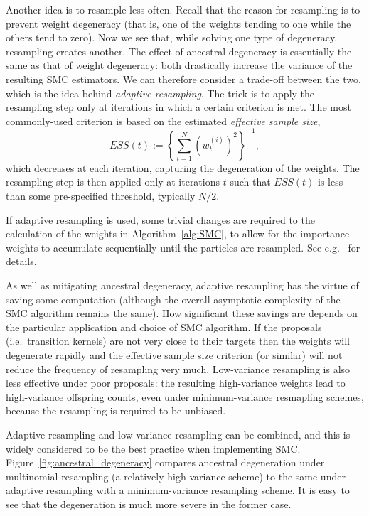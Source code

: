 Another idea is to resample less often. Recall that the reason for resampling is to prevent weight degeneracy (that is, one of the weights tending to one while the others tend to zero). Now we see that, while solving one type of degeneracy, resampling creates another. The effect of ancestral degeneracy is essentially the same as that of weight degeneracy: both drastically increase the variance of the resulting SMC estimators. 
We can therefore consider a trade-off between the two, which is the idea behind \emph{adaptive resampling}\seb{[citation]}.
The trick is to apply the resampling step only at iterations in which a certain criterion is met. The most  commonly-used criterion is based on the estimated \emph{effective sample size},
\begin{equation*}
ESS(t) := \left\{ \sum_{i=1}^N (w_t^{(i)})^2 \right\}^{-1} ,
\end{equation*}
which decreases at each iteration, capturing the degeneration of the weights.
The resampling step is then applied only at iterations $t$ such that $ESS(t)$ is less than some pre-specified threshold, typically $N/2$\seb{[citation]}.

If adaptive resampling is used, some trivial changes are required to the calculation of the weights in Algorithm~\ref{alg:SMC}, to allow for the importance weights to accumulate sequentially until the particles are resampled. See e.g.\ \textcite[Section 10.2]{chopin2020} for details.

As well as mitigating ancestral degeneracy, adaptive resampling has the virtue of saving some computation (although the overall asymptotic complexity of the SMC algorithm remains the same).
How significant these savings are depends on the particular application and choice of SMC algorithm. If the proposals (i.e.\ transition kernels) are not very close to their targets then the weights will degenerate rapidly and the effective sample size criterion (or similar) will not reduce the frequency of resampling very much.
Low-variance resampling is also less effective under poor proposals: the resulting high-variance weights lead to high-variance offspring counts, even under minimum-variance resmapling schemes, because the resampling is required to be unbiased.

Adaptive resampling and low-variance resampling can be combined, and this is widely considered to be the best practice when implementing SMC.
Figure~\ref{fig:ancestral_degeneracy} compares ancestral degeneration under multinomial resampling (a relatively high variance scheme) to the same under adaptive resampling with a minimum-variance resampling scheme.
It is easy to see that the degeneration is much more severe in the former case.

